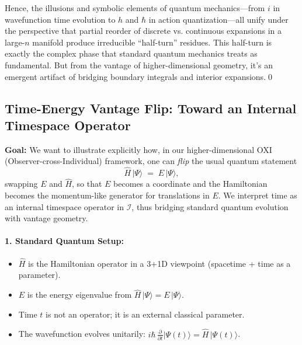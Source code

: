 \documentclass{article}
\begin{document}
Hence, the illusions and symbolic elements of quantum mechanics---from $i$ in wavefunction time evolution to $h$ and $\hbar$ in action quantization---all unify under the perspective that partial reorder of discrete vs. continuous expansions in a large-$n$ manifold produce irreducible “half-turn” residues. This half-turn is exactly the complex phase that standard quantum mechanics treats as fundamental. But from the vantage of higher-dimensional geometry, it’s an emergent artifact of bridging boundary integrals and interior expansions.\qed





\subsection*{Time-Energy Vantage Flip: Toward an Internal Timespace Operator}

\noindent\textbf{Goal:} We want to illustrate explicitly how, in our higher-dimensional OXI (Observer-cross-Individual) framework, one can \emph{flip} the usual quantum statement
\begin{equation}
\hat{H}\,\lvert\Psi\rangle\;=\;E\,\lvert\Psi\rangle,
\end{equation}
swapping $E$ and $\hat{H}$, so that $E$ becomes a coordinate and the Hamiltonian becomes the momentum-like generator for translations in $E$. We interpret time as an internal timespace operator in $\mathcal{I}$, thus bridging standard quantum evolution with vantage geometry.

\paragraph{1. Standard Quantum Setup:}\vspace{-6pt}
\begin{itemize}
\item $\hat{H}$ is the Hamiltonian operator in a 3+1D viewpoint (spacetime + time as a parameter).\vspace{-4pt}
\item $E$ is the energy eigenvalue from $\hat{H}\,\lvert \Psi \rangle = E\,\lvert\Psi\rangle$.\vspace{-4pt}
\item Time $t$ is not an operator; it is an external classical parameter.\vspace{-4pt}
\item The wavefunction evolves unitarily: $i\hbar\,\tfrac{\partial}{\partial t}\lvert\Psi(t)\rangle=\hat{H}\,\lvert\Psi(t)\rangle$.
\end{itemize}
\end{document}
